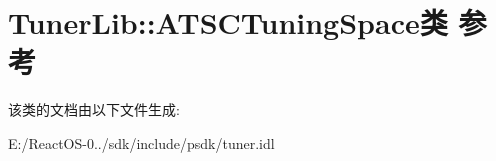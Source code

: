 \hypertarget{class_tuner_lib_1_1_a_t_s_c_tuning_space}{}\section{Tuner\+Lib\+:\+:A\+T\+S\+C\+Tuning\+Space类 参考}
\label{class_tuner_lib_1_1_a_t_s_c_tuning_space}


该类的文档由以下文件生成\+:\begin{DoxyCompactItemize}
\item 
E\+:/\+React\+O\+S-\/0../sdk/include/psdk/tuner.\+idl\end{DoxyCompactItemize}
